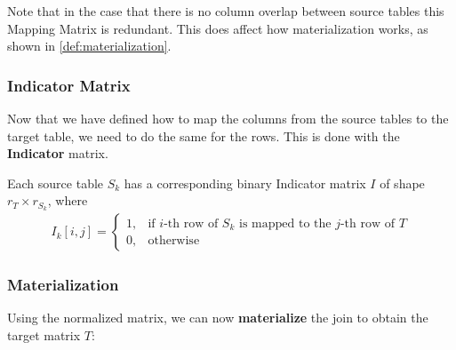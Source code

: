 Note that in the case that there is no column overlap between source tables this Mapping Matrix is redundant. This does affect how materialization works, as shown in \autoref{def:materialization}.


\subsubsection{Indicator Matrix}
Now that we have defined how to map the columns from the source tables to the target table, we need to do the same for the rows. This is done with the \textbf{Indicator} matrix.

\begin{definition}
    Each source table $S_k$ has a corresponding binary Indicator matrix $I$ of shape $r_T \times r_{S_k}$, where
    \begin{align*}
        I_k[i,j] = \begin{cases}
                       1, & \text{if $i$-th row of $S_k$ is mapped to the $j$-th row of $T$} \\
                       0, & \text{otherwise}
                   \end{cases}
    \end{align*}
\end{definition}



\subsubsection{Materialization}
Using the normalized matrix, we can now \textbf{materialize} the join to obtain the target matrix $T$:

